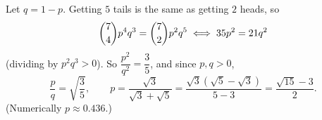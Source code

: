 Let $q=1-p$. Getting $5$ tails is the same as getting $2$ heads, so
\[\dbinom74p^4q^3=\dbinom72p^2q^5\iff35p^2=21q^2\]
(dividing by $p^2q^3>0$). So $\dfrac{p^2}{q^2}=\dfrac35$, and since $p,q>0$,
\[\dfrac pq=\sqrt{\dfrac35},\qquad p=\dfrac{\sqrt3}{\sqrt3+\sqrt5}=\dfrac{\sqrt3\left(\sqrt5-\sqrt3\right)}{5-3}=\boxed{\dfrac{\sqrt{15}-3}{2}}.\]
(Numerically $p\approx0.436$.)
